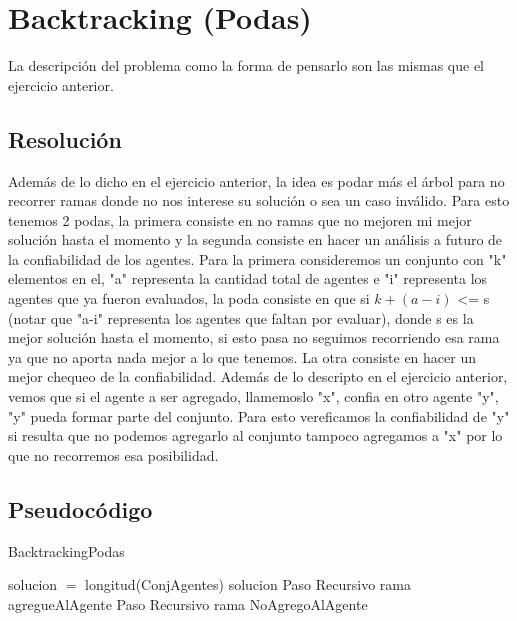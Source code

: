 \section{Backtracking (Podas)}

	La descripción del problema como la forma de pensarlo son las mismas que el ejercicio anterior.

\subsection{Resolución}
	
	Además de lo dicho en el ejercicio anterior, la idea es podar más el árbol para no recorrer ramas donde no nos interese su solución o sea un caso inválido. Para esto tenemos 2 podas, la primera consiste en no ramas que no mejoren mi mejor solución hasta el momento y la segunda consiste en hacer un análisis a futuro de la confiabilidad de los agentes. Para la primera consideremos un conjunto con "k" elementos en el, "a" representa la cantidad total de agentes e "i" representa los agentes que ya fueron evaluados, la poda consiste en que si $k+(a-i)$ <= s (notar que "a-i" representa los agentes que faltan por evaluar), donde s es la mejor solución hasta el momento, si esto pasa no seguimos recorriendo esa rama ya que no aporta nada mejor a lo que tenemos. La otra consiste en hacer un mejor chequeo de la confiabilidad. Además de lo descripto en el ejercicio anterior, vemos que si el agente a ser agregado, llamemoslo "x", confia en otro agente "y", "y" pueda formar parte del conjunto.  Para esto vereficamos la confiabilidad de "y" si resulta que no podemos agregarlo al conjunto tampoco agregamos a "x" por lo que no recorremos esa posibilidad. 
	
\subsection{Pseudocódigo}  
	
\begin{algorithm}[H]
\caption{BacktrackingPodas}\label{Ej1.1}

\begin{algorithmic}[H]
\State solucion $=$ longitud(ConjAgentes)
\EndIf
\State\Return solucion
\EndIf
{}
\State Paso Recursivo rama agregueAlAgente
\EndIf
{}
\State Paso Recursivo rama NoAgregoAlAgente
\EndIf
\EndProcedure
\end{algorithmic}

\end{algorithm}

